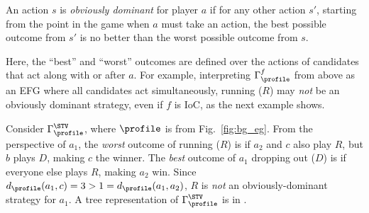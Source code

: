 \begin{definition}
     An action $s$ is \emph{obviously dominant} for player $a$ if for any other action $s'$, starting from the point in the game when $a$ must take an action, the best possible outcome from $s'$ is no better than the worst possible outcome from $s$.
\end{definition}

Here, the ``best'' and ``worst'' outcomes are defined over the actions of candidates that act along with or after $a$. For example, interpreting $\Gamma^f_{\profile}$ from above as an EFG where all candidates act simultaneously, running ($R$) may \emph{not} be an obviously dominant strategy, even if $f$ is IoC, as the next example shows.




\begin{example}

    Consider $\Gamma^{\STV}_{\profile}$, where $\profile$ is from Fig.~\ref{fig:bg_eg}. From the perspective of $a_1$, the \emph{worst} outcome of running ($R$) is if $a_2$ and $c$ also play $R$, but $b$ plays $D$, making $c$ the winner. The \emph{best} outcome of $a_1$ dropping out ($D$) is if everyone else plays $R$, making $a_2$ win. Since $d_{\profile}(a_1,c)=3>1=d_{\profile}(a_1,a_2)$, $R$ is \emph{not} an obviously-dominant strategy for $a_1$. A tree representation of $\Gamma^{\STV}_{\profile}$ is in .
\end{example}


